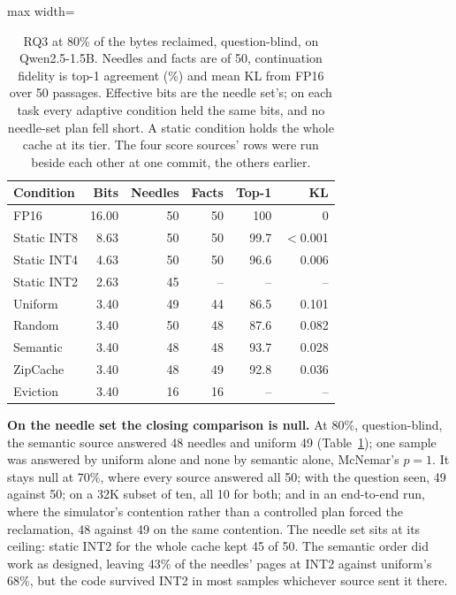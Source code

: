 \documentclass{article}
\begin{document}
\begin{table}[t]
\caption{RQ3 at 80\% of the bytes reclaimed, question-blind, on Qwen2.5-1.5B.
Needles and facts are of 50, continuation fidelity is top-1 agreement (\%) and
mean KL from FP16 over 50 passages. Effective bits are the needle set's; on
each task every adaptive condition held the same bits, and no needle-set plan
fell short. A static condition holds the whole cache at its tier. The four score
sources' rows were run beside each other at one commit, the others earlier.}
\label{tab:rq3}
\centering
\small
\begin{adjustbox}{max width=\columnwidth}
\begin{tabular}{lrrrrr}
\toprule
Condition & Bits & Needles & Facts & Top-1 & KL \\
\midrule
FP16 & 16.00 & 50 & 50 & 100 & 0 \\
Static INT8 & 8.63 & 50 & 50 & 99.7 & $<$0.001 \\
Static INT4 & 4.63 & 50 & 50 & 96.6 & 0.006 \\
Static INT2 & 2.63 & 45 & -- & -- & -- \\
Uniform & 3.40 & 49 & 44 & 86.5 & 0.101 \\
Random & 3.40 & 50 & 48 & 87.6 & 0.082 \\
Semantic & 3.40 & 48 & 48 & 93.7 & 0.028 \\
ZipCache & 3.40 & 48 & 49 & 92.8 & 0.036 \\
Eviction & 3.40 & 16 & 16 & -- & -- \\
\bottomrule
\end{tabular}
\end{adjustbox}
\end{table}

\textbf{On the needle set the closing comparison is null.} At 80\%, question-blind, the semantic
source answered 48 needles and uniform 49 (Table~\ref{tab:rq3}); one sample was
answered by uniform alone and none by semantic alone, McNemar's $p = 1$. It
stays null at 70\%, where every source answered all 50; with the question
seen, 49 against 50; on a 32K subset of ten, all 10 for both; and in an
end-to-end run, where the simulator's contention rather than a controlled
plan forced the reclamation, 48 against 49 on the same contention. The needle
set sits at its ceiling: static INT2 for the whole cache kept 45 of 50. The
semantic order did work as designed, leaving 43\% of the needles' pages at INT2
against uniform's 68\%, but the code survived INT2 in most samples whichever
source sent it there.
\end{document}
